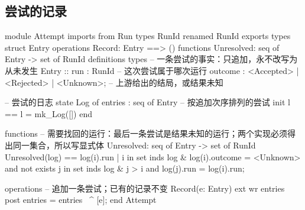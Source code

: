 \subsection{尝试的记录}

\begin{vdm_al}
module Attempt
imports from Run types RunId renamed RunId
exports
  types struct Entry
  operations Record: Entry ==> ()
  functions Unresolved: seq of Entry -> set of RunId
definitions
types
  -- 一条尝试的事实：只追加，永不改写为从未发生
  Entry ::
    run : RunId  -- 这次尝试属于哪次运行
    outcome : <Accepted> | <Rejected> | <Unknown>;  -- 上游给出的结局，或结果未知

  -- 尝试的日志
state Log of
  entries : seq of Entry  -- 按追加次序排列的尝试
  init l == l = mk_Log([])
end

functions
  -- 需要找回的运行：最后一条尝试是结果未知的运行；两个实现必须得出同一集合，所以写显式体
  Unresolved: seq of Entry -> set of RunId
  Unresolved(log) ==
    {log(i).run | i in set inds log &
       log(i).outcome = <Unknown>
       and not exists j in set inds log & j > i and log(j).run = log(i).run};

operations
  -- 追加一条尝试；已有的记录不变
  Record(e: Entry)
  ext wr entries
  post entries = entries~ ^ [e];
end Attempt
\end{vdm_al}
